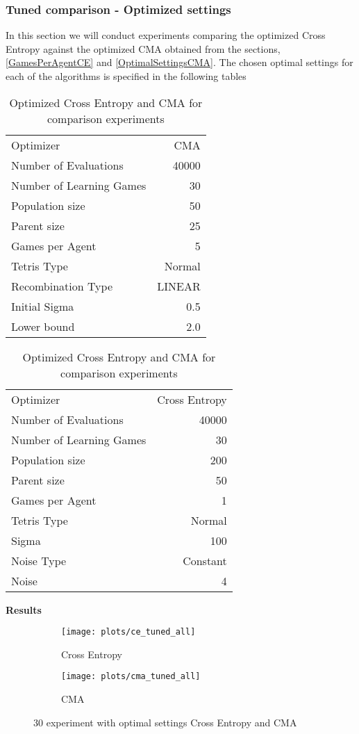 \subsubsection{Tuned comparison - Optimized settings \label{tunedComparison}}
In this section we will conduct experiments comparing the optimized Cross Entropy against the
optimized CMA obtained from the sections, \ref{GamesPerAgentCE} and \ref{OptimalSettingsCMA}.
The chosen optimal settings for each of the algorithms is specified in the following tables
\begin{table}[h]
\centering
\begin{tabular}{l r}
Optimizer & CMA\\
Number of Evaluations & 40000\\
Number of Learning Games & 30\\
Population size& 50\\
Parent size & 25\\
Games per Agent & 5\\
Tetris Type & Normal\\
\hline
Recombination Type & LINEAR\\
Initial Sigma & 0.5\\
Lower bound & 2.0\\
\end{tabular}
\quad
\begin{tabular}{l r}
Optimizer & Cross Entropy\\
Number of Evaluations & 40000\\
Number of Learning Games & 30\\
Population size & 200\\
Parent size & 50\\
Games per Agent & 1\\
Tetris Type & Normal\\
\hline
Sigma & 100\\
Noise Type & Constant\\
Noise & 4
\end{tabular}
\caption{Optimized Cross Entropy and CMA for comparison experiments}
\end{table}

\textbf{Results}\\

\begin{figure}[H]
	\centering
	\captionsetup[subfigure]{justification=centering}
    \begin{subfigure}[b]{0.49\textwidth}
    	\caption{Cross Entropy}
        \texttt{[image: plots/ce\_tuned\_all]}
    \end{subfigure} 
    \begin{subfigure}[b]{0.49\textwidth}
    	\caption{CMA}
        \texttt{[image: plots/cma\_tuned\_all]}
    \end{subfigure}

    \caption{30 experiment with optimal settings Cross Entropy and CMA}
\end{figure}

